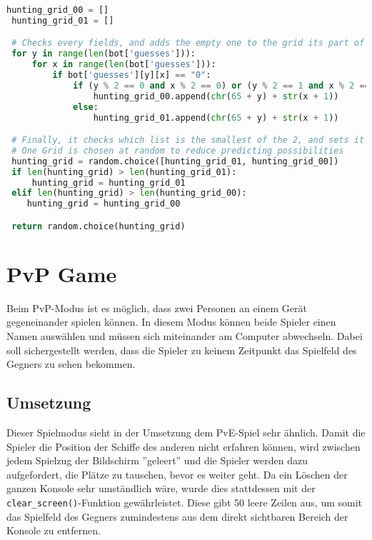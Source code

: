 \documentclass{article}
\begin{document}
\begin{lstlisting}[language=Python, caption = Herstellung der zwei möglichen Grids und deren Vergleich]
 hunting_grid_00 = []
 hunting_grid_01 = []

 # Checks every fields, and adds the empty one to the grid its part of
 for y in range(len(bot['guesses'])):
     for x in range(len(bot['guesses'])):
         if bot['guesses'][y][x] == "0":
             if (y % 2 == 0 and x % 2 == 0) or (y % 2 == 1 and x % 2 == 1):
                 hunting_grid_00.append(chr(65 + y) + str(x + 1))
             else:
                 hunting_grid_01.append(chr(65 + y) + str(x + 1))

 # Finally, it checks which list is the smallest of the 2, and sets it as our hunting grid
 # One Grid is chosen at random to reduce predicting possibilities
 hunting_grid = random.choice([hunting_grid_01, hunting_grid_00])
 if len(hunting_grid) > len(hunting_grid_01):
     hunting_grid = hunting_grid_01
 elif len(hunting_grid) > len(hunting_grid_00):
    hunting_grid = hunting_grid_00

 return random.choice(hunting_grid)
\end{lstlisting}

\section{PvP Game}
\par
    Beim PvP-Modus ist es möglich, dass zwei Personen an einem Gerät gegeneinander spielen können. In diesem Modus können beide Spieler einen Namen auswählen und müssen sich miteinander am Computer abwechseln. Dabei soll sichergestellt werden, dass die Spieler zu keinem Zeitpunkt das Spielfeld des Gegners zu sehen bekommen.
\subsection{Umsetzung}
    Dieser Spielmodus sieht in der Umsetzung dem PvE-Spiel sehr ähnlich. Damit die Spieler  die Position der Schiffe des anderen nicht erfahren können, wird zwischen jedem Spielzug der Bildschirm ''geleert'' und die Spieler werden dazu aufgefordert, die Plätze zu tauschen, bevor es weiter geht. Da ein Löschen der ganzen Konsole sehr umständlich wäre, wurde dies stattdessen mit der \verb$clear_screen()$-Funktion gewährleistet. Diese gibt 50 leere Zeilen aus, um somit das Spielfeld des Gegners zumindestens aus dem direkt sichtbaren Bereich der Konsole zu entfernen.
\end{document}
